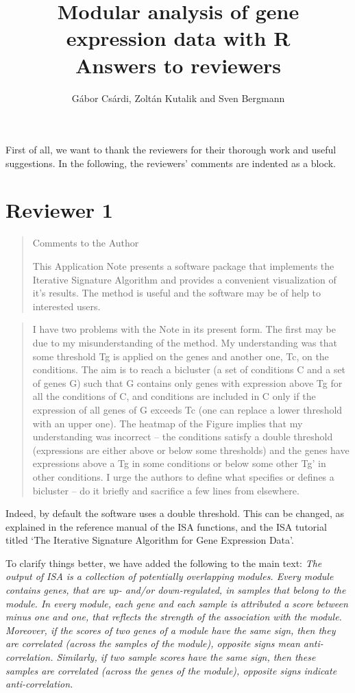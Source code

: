 \documentclass[a4paper]{article}
\title{Modular analysis of gene expression data with R\\
  Answers to reviewers}
\author{G\'abor Cs\'ardi, Zolt\'an Kutalik and Sven Bergmann}
\begin{document}
\maketitle

First of all, we want to thank the reviewers for their thorough work
and useful suggestions. In the following, the reviewers' comments are
indented as a block.

\section{Reviewer 1}

\begin{quote}
Comments to the Author

This Application Note presents a software package that implements the
Iterative Signature Algorithm and provides a convenient visualization
of it’s results. The method is useful and the software may be of help
to interested users. 
\end{quote}

\begin{quote}
I have two problems with the Note in its present form.
The first may be due to my misunderstanding of the method. My
understanding was that some threshold Tg is applied on the genes and
another one, Tc, on the conditions. The aim is to reach a bicluster (a
set of conditions C and a set of genes G) such that G contains only
genes with expression above Tg for all the conditions of C, and
conditions are included in C only if the expression of all genes of G
exceeds Tc (one can replace a lower threshold with an upper one). The
heatmap of the Figure implies that my understanding was incorrect –
the conditions satisfy a double threshold (expressions are either
above or below some thresholds) and the genes have expressions above a
Tg in some conditions or below some other Tg’ in other conditions. 
I urge the authors to define what specifies or defines a bicluster –
do it briefly and sacrifice a few lines from elsewhere. 
\end{quote}

Indeed, by default the software uses a double threshold. This can be
changed, as explained in the reference manual of the ISA functions,
and the ISA tutorial titled `The Iterative Signature Algorithm for
Gene Expression Data'.

To  clarify things better, we have added the following to the main
text:
\textsl{The output of ISA is a collection of potentially overlapping
modules. Every module contains genes, that are up- and/or
down-regulated, in samples that belong to the module.
In every module, each gene and each sample is attributed a
score between minus one and one, that reflects the strength of the
association with the module. Moreover, if the scores of two genes of a
module have the same sign, then they are correlated (across the
samples of the module), opposite signs mean
anti-correlation. Similarly, if two sample
scores have the same sign, then these samples are correlated (across
the genes of the module), opposite signs indicate anti-correlation.}
\end{document}
